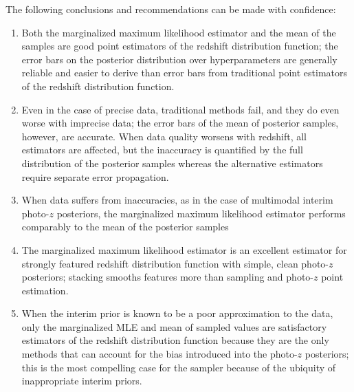 The following conclusions and recommendations can be made with confidence:

\begin{enumerate}
	\item Both the marginalized maximum likelihood estimator and the mean of the samples are good point estimators of the redshift distribution function; the error bars on the posterior distribution over hyperparameters are generally reliable and easier to derive than error bars from traditional point estimators of the redshift distribution function.
	\item Even in the case of precise data, traditional methods fail, and they do even worse with imprecise data; the error bars of the mean of posterior samples, however, are accurate.  When data quality worsens with redshift, all estimators are affected, but the inaccuracy is quantified by the full distribution of the posterior samples whereas the alternative estimators require separate error propagation.  
	\item When data suffers from inaccuracies, as in the case of multimodal interim photo-$z$ posteriors, the marginalized maximum likelihood estimator performs comparably to the mean of the posterior samples
	\item The marginalized maximum likelihood estimator is an excellent estimator for strongly featured redshift distribution function with simple, clean photo-$z$ posteriors; stacking smooths features more than sampling and photo-$z$ point estimation.
	\item When the interim prior is known to be a poor approximation to the data, only the marginalized MLE and mean of sampled values are satisfactory estimators of the redshift distribution function because they are the only methods that can account for the bias introduced into the photo-$z$ posteriors; this is the most compelling case for the sampler because of the ubiquity of inappropriate interim priors.
\end{enumerate}

